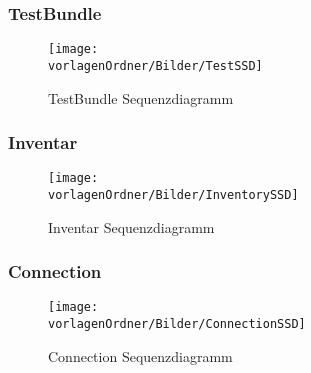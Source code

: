 \documentclass[]{subfiles}
\begin{document}
	\subsubsection{TestBundle}
	\begin{figure}[h!]
		\texttt{[image: \\vorlagenOrdner/Bilder/TestSSD]}
		\caption{TestBundle Sequenzdiagramm}
	\end{figure}

	\newpage
	
	\subsubsection{Inventar}
	\begin{figure}[h!]
		\texttt{[image: \\vorlagenOrdner/Bilder/InventorySSD]}
		\caption{Inventar Sequenzdiagramm}
	\end{figure}

	\newpage

	\subsubsection{Connection}
	\begin{figure}[h!]
		\texttt{[image: \\vorlagenOrdner/Bilder/ConnectionSSD]}
		\caption{Connection Sequenzdiagramm}		
	\end{figure}
		
\end{document}

